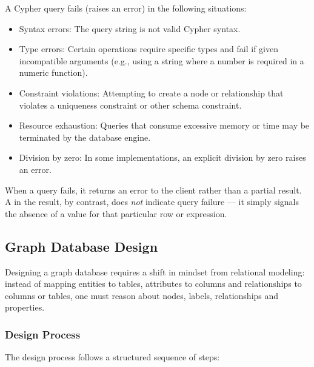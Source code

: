 \noindent
A Cypher query fails (raises an error) in the following situations:

\begin{itemize}
    \item Syntax errors: The query string is not valid Cypher syntax.
    \item Type errors: Certain operations require specific types and fail if given incompatible arguments (e.g., using a string where a number is required in a numeric function).
    \item Constraint violations: Attempting to create a node or relationship that violates a uniqueness constraint or other schema constraint.
    \item Resource exhaustion: Queries that consume excessive memory or time may be terminated by the database engine.
    \item Division by zero: In some implementations, an explicit division by zero raises an error.
\end{itemize}

When a query fails, it returns an error to the client rather than a partial result. A  in the result, by contrast, does \emph{not} indicate query failure --- it simply signals the absence of a value for that particular row or expression.

\subsection{Graph Database Design}

Designing a graph database requires a shift in mindset from relational modeling: instead of mapping entities to tables, attributes to columns and relationships to columns or tables, one must reason about nodes, labels, relationships and properties.

\subsubsection{Design Process}

The design process follows a structured sequence of steps\cite{robinson2015graph}:

